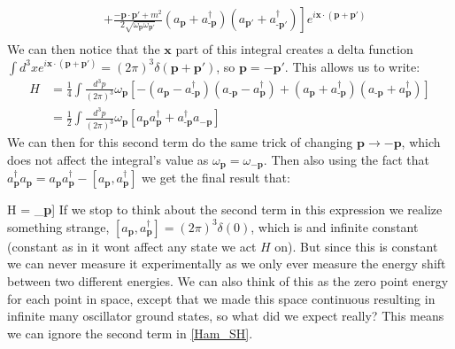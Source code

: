 \documentclass[11pt]{article}
\renewenvironment{flalign}{\vspace{-2mm}\empheq[box=\tcbhighmath]{align}}{\endempheq}
\numberwithin{equation}{section}
\begin{document}
\begin{itemize}
\begin{equation*}
\begin{split}
       & \left. + \frac{-\textbf{p}\cdot \textbf{p}'+m^2}{2\sqrt{\omega_{\textbf{p}}\omega_{\textbf{p}'}}}\left(a_{\textbf{p}}+a^{\dagger}_{\textbf{-p}}\right)\left(a_{\textbf{p}'}+a^{\dagger}_{\textbf{-p}'}\right)\right]e^{i\textbf{x}\cdot(\textbf{p}+\textbf{p}')} \\
    \end{split}
  \end{equation*}
  We can then notice that the $\textbf{x}$ part of this integral creates a delta function $\int d^3xe^{i\textbf{x}\cdot(\textbf{p}+\textbf{p}')} = (2\pi)^{3}\delta(\textbf{p}+\textbf{p}')$, so $\textbf{p}= - \textbf{p}'$. This allows us to write:
  \begin{equation*}
    \begin{split}
    H  & = \frac{1}{4}\int\frac{d^3p}{(2\pi)^3}\omega_{\textbf{p}}\left[-\left(a_{\textbf{p}}-a^{\dagger}_{\textbf{-p}}\right)\left(a_{\textbf{-p}}-a^{\dagger}_{\textbf{p}}\right) + \left(a_{\textbf{p}}+a^{\dagger}_{\textbf{-p}}\right)\left(a_{\textbf{-p}}+a^{\dagger}_{\textbf{p}}\right) \right]  \\ 
    & = \frac{1}{2}\int\frac{d^3p}{(2\pi)^3}\omega_{\textbf{p}}\left[a_{\textbf{p}}a^{\dagger}_{\textbf{p}}+a^{\dagger}_{\textbf{-p}}a_{-\textbf{p}}\right]
 \end{split}
  \end{equation*}
  We can then for this second term do the same trick of changing $\textbf{p} \rightarrow -\textbf{p}$, which does not affect the integral's value as $\omega_{\textbf{p}} = \omega_{-\textbf{p}}$. Then also using the fact that $a^{\dagger}_{\textbf{p}}a_{\textbf{p}} = a_{\textbf{p}}a^{\dagger}_{\textbf{p}}-[a_{\textbf{p}},a^{\dagger}_{\textbf{p}}]$ we get the final result that:

  \begin{flalign}
  \label{Ham_SH}
  H = \int {}\omega_{\textbf{p}}\left[a_{\textbf{p}}a^{\dagger}_{\textbf{p}}-\frac{1}{2}[a_{\textbf{p}},a^{\dagger}_{\textbf{p}}]\right]
  \end{flalign}
  If we stop to think about the second term in this expression we realize something strange, $[a_{\textbf{p}},a^{\dagger}_{\textbf{p}}] = (2\pi)^3\delta(0)$, which is and infinite constant (constant as in it wont affect any state we act $H$ on). But since this is constant we can never measure it experimentally as we only ever measure the energy shift between two different energies. We can also think of this as the zero point energy for each point in space, except that we made this space continuous resulting in infinite many oscillator ground states, so what did we expect really? This means we can ignore the second term in \ref{Ham_SH}.


\end{itemize}
\end{document}
